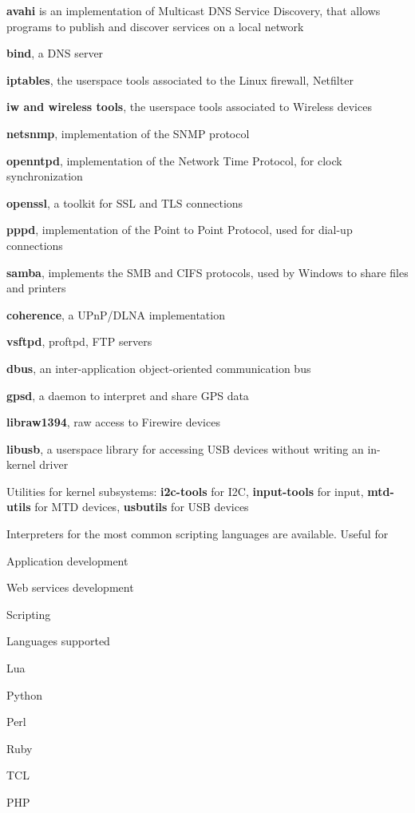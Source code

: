  \startitemize
  \item {\bf avahi} is an implementation of Multicast DNS Service
    Discovery, that allows programs to publish and discover services
    on a local network
  \item {\bf bind}, a DNS server
  \item {\bf iptables}, the userspace tools associated to the Linux firewall, Netfilter
  \item {\bf iw and wireless tools}, the userspace tools associated to Wireless devices
  \item {\bf netsnmp}, implementation of the SNMP protocol
  \item {\bf openntpd}, implementation of the Network Time Protocol,
    for clock synchronization
  \item {\bf openssl}, a toolkit for SSL and TLS connections
  \stopitemize

  \startitemize
  \item {\bf pppd}, implementation of the Point to Point Protocol,
    used for dial-up connections
  \item {\bf samba}, implements the SMB and CIFS protocols, used by
    Windows to share files and printers
  \item {\bf coherence}, a UPnP/DLNA implementation
  \item {\bf vsftpd}, proftpd, FTP servers
  \stopitemize

  \startitemize
  \item {\bf dbus}, an inter-application object-oriented communication bus
  \item {\bf gpsd}, a daemon to interpret and share GPS data
  \item {\bf libraw1394}, raw access to Firewire devices
  \item {\bf libusb}, a userspace library for accessing USB devices
    without writing an in-kernel driver
  \item Utilities for kernel subsystems: {\bf i2c-tools} for I2C, {\bf
      input-tools} for input, {\bf mtd-utils} for MTD devices, {\bf
      usbutils} for USB devices
  \stopitemize

  \startitemize
  \item Interpreters for the most common scripting languages are
    available. Useful for
    \startitemize
    \item Application development
    \item Web services development
    \item Scripting
    \stopitemize
  \item Languages supported
    \startitemize
    \item Lua
    \item Python
    \item Perl
    \item Ruby
    \item TCL
    \item PHP
    \stopitemize
  \stopitemize

